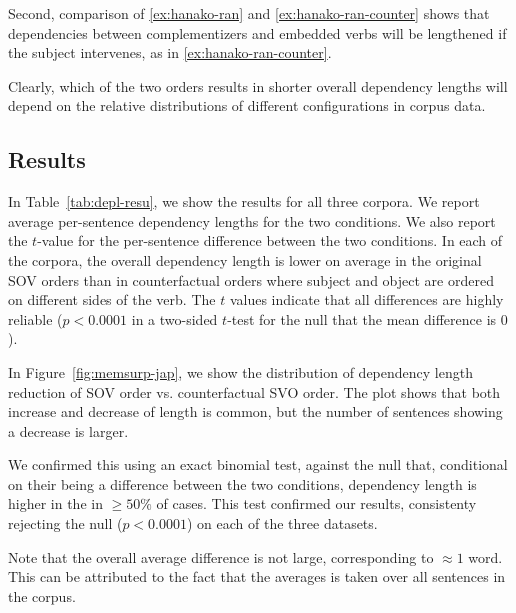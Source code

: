 \documentclass[11pt,a4paper]{article}
\begin{document}
Second, comparison of \ref{ex:hanako-ran} and \ref{ex:hanako-ran-counter} shows that dependencies between complementizers and embedded verbs will be lengthened if the subject intervenes, as in \ref{ex:hanako-ran-counter}.

Clearly, which of the two orders results in shorter overall dependency lengths will depend on the relative distributions of different configurations in corpus data. %

\subsection{Results}
In Table~\ref{tab:depl-resu}, we show the results for all three corpora. %
We report average per-sentence dependency lengths for the two conditions. %
We also report the $t$-value for the per-sentence difference between the two conditions.
In each of the corpora, the overall dependency length is lower on average in the original SOV orders than in counterfactual orders where subject and object are ordered on different sides of the verb.
The $t$ values indicate that all differences are highly reliable ($p < 0.0001$ in a two-sided $t$-test for the null that the mean difference is $0$).

In Figure~\ref{fig:memsurp-jap}, we show the distribution of dependency length reduction of SOV order vs. counterfactual SVO order.
The plot shows that both increase and decrease of length is common, but the number of sentences showing a decrease is larger.

We confirmed this using an exact binomial test, against the null that, conditional on their being a difference between the two conditions, dependency length is higher in the in  $\geq 50\%$ of cases.
This test confirmed our results, consistenty rejecting the null ($p < 0.0001$) on each of the three datasets.

Note that the overall average difference is not large, corresponding to $\approx 1$ word.
This can be attributed to the fact that the averages is taken over all sentences in the corpus.
\end{document}
